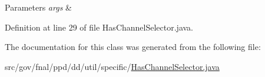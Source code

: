 \begin{DoxyParams}{Parameters}
{\em args} & \\
\hline
\end{DoxyParams}


Definition at line 29 of file Has\-Channel\-Selector.\-java.



The documentation for this class was generated from the following file\-:\begin{DoxyCompactItemize}
\item 
src/gov/fnal/ppd/dd/util/specific/\hyperlink{HasChannelSelector_8java}{Has\-Channel\-Selector.\-java}\end{DoxyCompactItemize}
